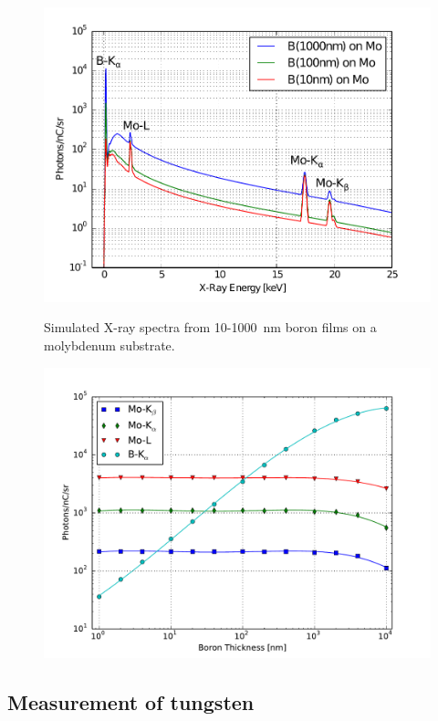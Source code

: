 \documentclass[12pt,letterpaper,final]{article}
\begin{document}
\begin{figure}[!h]
 \centering
  \includegraphics[width=\columnwidth]{figures/BoronOnMoSpectra.pdf}
 \label{fig:BoronOnMoSpectrum}
 \caption{Simulated X-ray spectra from 10-1000~nm boron films on a molybdenum substrate.}
\end{figure}

\begin{figure}[!h]
 \centering
  \includegraphics[width=\columnwidth]{figures/BoronLayerXRayIntensityVsThickness.pdf}
 \caption{}
 \label{fig:BoronIntensity}
\end{figure}

\subsection{Measurement of tungsten}
\end{document}
